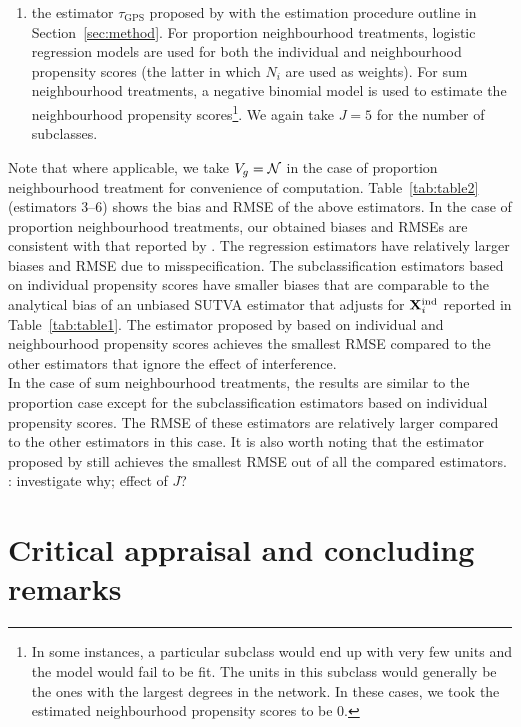 \documentclass[10pt]{article}
\begin{document}
\begin{enumerate}
\item
the estimator $\tau_\text{GPS}$ proposed by \textcite{Forastiere:2021} with the estimation procedure outline in Section~\ref{sec:method}. For proportion neighbourhood treatments, logistic regression models are used for both the individual and neighbourhood propensity scores (the latter in which $N_i$ are used as weights). For sum neighbourhood treatments, a negative binomial model is used to estimate the neighbourhood propensity scores\footnote{In some instances, a particular subclass would end up with very few units and the model would fail to be fit. The units in this subclass would generally be the ones with the largest degrees in the network. In these cases, we took the estimated neighbourhood propensity scores to be 0.}. We again take $J=5$ for the number of subclasses.

\end{enumerate}
Note that where applicable, we take $V_g=\mathcal{N}$ in the case of proportion neighbourhood treatment for convenience of computation. Table~\ref{tab:table2} (estimators 3--6) shows the bias and RMSE of the above estimators. In the case of proportion neighbourhood treatments, our obtained biases and RMSEs are consistent with that reported by \textcite{Forastiere:2021}. The regression estimators have relatively larger biases and RMSE due to misspecification. The subclassification estimators based on individual propensity scores have smaller biases that are comparable to the analytical bias of an unbiased SUTVA estimator that adjusts for $\mathbf{X}^{\text{ind}}_i$ reported in Table~\ref{tab:table1}. The estimator proposed by \citeauthor{Forastiere:2021} based on individual and neighbourhood propensity scores achieves the smallest RMSE compared to the other estimators that ignore the effect of interference.
\\

In the case of sum neighbourhood treatments, the results are similar to the proportion case except for the subclassification estimators based on individual propensity scores. The RMSE of these estimators are relatively larger compared to the other estimators in this case. It is also worth noting that the estimator proposed by \citeauthor{Forastiere:2021} still achieves the smallest RMSE out of all the compared estimators.
\\

\todo: investigate why; effect of $J$?



\section{Critical appraisal and concluding remarks}
\end{document}
